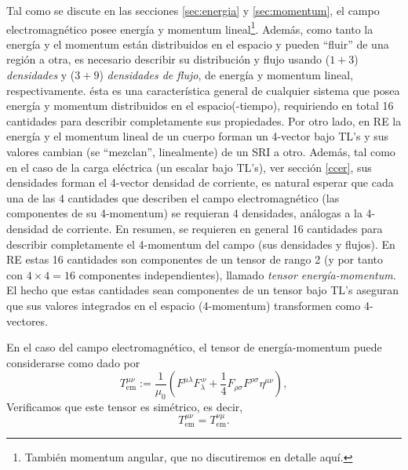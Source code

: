 Tal como se discute en las secciones \ref{sec:energia} y \ref{sec:momentum}, el campo electromagnético posee energía y momentum lineal\footnote{También momentum angular, que no discutiremos en detalle aquí.}. Además, como tanto la energía y el momentum están distribuidos en el espacio y pueden ``fluir'' de una región a otra, es necesario describir su distribución y flujo usando ($1+3$) \textit{densidades}  y ($3+9$) \textit{densidades de flujo}, de energía y momentum lineal, respectivamente. ésta es una característica general de cualquier sistema que posea energía y momentum distribuidos en el espacio(-tiempo), requiriendo en total 16 cantidades para describir completamente sus propiedades. Por otro lado, en RE la energía y el momentum lineal de un cuerpo forman un 4-vector bajo TL's y sus valores cambian (se ``mezclan'', linealmente) de un SRI a otro. Además, tal como en el caso de la carga eléctrica (un escalar bajo TL's), ver sección \ref{ccer}, sus densidades forman el 4-vector densidad de corriente, es natural esperar que cada una de las 4 cantidades que describen el campo electromagnético (las componentes de su 4-momentum) se requieran 4 densidades, análogas a la 4-densidad de corriente. En resumen, se requieren en general 16 cantidades para describir completamente el 4-momentum del campo (sus densidades y flujos). En RE estas 16 cantidades son componentes de un tensor de rango 2 (y por tanto con $4\times 4=16$ componentes independientes), llamado \textit{tensor energía-momentum}. El hecho que estas cantidades sean componentes de un tensor bajo TL's aseguran que sus valores integrados en el espacio (4-momentum) transformen como 4-vectores. 

En el caso del campo electromagnético, el tensor de energía-momentum puede considerarse como dado por
\begin{equation}
\boxed{T_\text{em}^{\mu\nu}:=\frac{1}{\mu_0}\left(  F^{\mu\lambda}F_\lambda^{\ \nu}+\frac{1}{4}F_{\rho\sigma}F^{\rho\sigma}\eta^{\mu\nu} \right),}  \label{temsimSI}
\end{equation}
Verificamos que este tensor es simétrico, es decir, 
\begin{equation}
T_\text{em}^{\mu\nu}=T_\text{em}^{\nu\mu}.
\end{equation}


